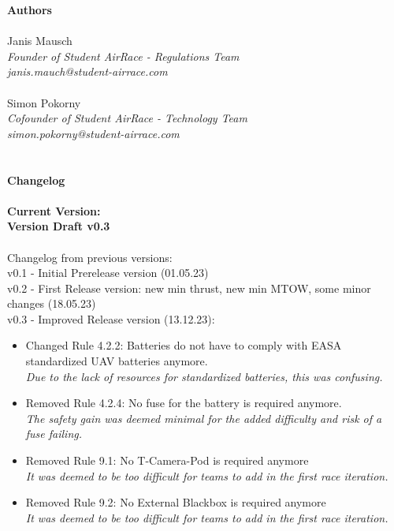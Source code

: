 \documentclass{article}
\newcommand*{\getVersion}{v0.3}
\begin{document}


\tableofcontents{}

\newpage
{\bf Authors}
\\ \\Janis Mausch \emph{\\Founder of Student AirRace - Regulations Team \\janis.mauch@student-airrace.com}
\\ \\ Simon Pokorny \emph{\\Cofounder of Student AirRace - Technology Team \\simon.pokorny@student-airrace.com}
\\ \\ \\
{\bf Changelog}
\\ \\{\bf Current Version: \\Version Draft \getVersion{}}
\\ \\Changelog from previous versions: 
\\ v0.1 - Initial Prerelease version (01.05.23)
\\ v0.2 - First Release version: new min thrust, new min MTOW, some minor changes (18.05.23)
\\ v0.3 - Improved Release version (13.12.23): 
\begin{itemize}
  \item Changed Rule 4.2.2: Batteries do not have to comply with EASA standardized UAV batteries anymore. \emph{\\Due to the lack of resources for standardized batteries, this was confusing.}
  \item Removed Rule 4.2.4: No fuse for the battery is required anymore. \emph{\\The safety gain was deemed minimal for the added difficulty and risk of a fuse failing.}
  \item Removed Rule 9.1: No T-Camera-Pod is required anymore \emph{\\It was deemed to be too difficult for teams to add in the first race iteration.}
  \item Removed Rule 9.2: No External Blackbox is required anymore \emph{\\It was deemed to be too difficult for teams to add in the first race iteration.}
\end{itemize}
\end{document}
